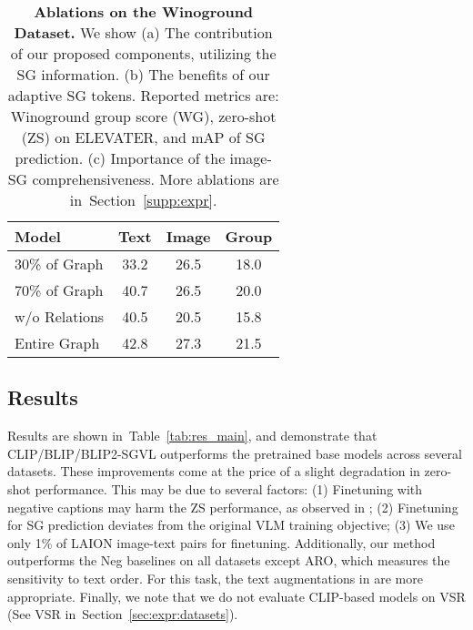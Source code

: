 \documentclass[11pt]{article}
\def\Secref#1{Section~\ref{#1}}
\newcommand{\tabref}[1]{Table~\ref{#1}}
\newcommand{\smodel}{SGVL}
\def\Secref#1{Section~\ref{#1}}
\begin{document}
\begin{table*}[ht]
\begin{subtable}[t]{0.25\linewidth}
\begin{tabularx}
{1\linewidth}{@{}l c c c}
        \toprule
        Model & Text & Image & Group \\
        \midrule
        30\% of Graph & 33.2 & 26.5  & 18.0  \\
        70\% of Graph & 40.7 & 26.5  & 20.0  \\
        w/o Relations & 40.5 & 20.5  & 15.8  \\
Entire Graph & 42.8 & 27.3  & 21.5  \\
        \bottomrule
\end{tabularx}
         \label{tab:comprehensivness}
     \end{subtable}
     \vspace{-0.5em}
     \caption{\textbf{Ablations on the Winoground Dataset.} We show (a) The contribution of our proposed components, utilizing the SG information. (b) The benefits of our adaptive SG tokens. Reported metrics are: Winoground group score (WG), zero-shot (ZS) on ELEVATER, and mAP of SG prediction. (c) Importance of the image-SG comprehensiveness. More ablations are in~\Secref{supp:expr}.}
     \label{tab:ablations}
    \vspace{-1.0em}
\end{table*} \subsection{Results}
\label{sec:expr:results}




Results are shown in~\tabref{tab:res_main}, and demonstrate that CLIP/BLIP/BLIP2-{\smodel} outperforms the pretrained base models across several datasets. These improvements come at the price of a slight degradation in zero-shot performance. This may be due to several factors: (1) Finetuning with negative captions may harm the ZS performance, as observed in \citet{yuksekgonul2023when}; (2) Finetuning for SG prediction deviates from the original VLM training objective; (3) We use only 1\% of LAION image-text pairs for finetuning. Additionally, our method outperforms the Neg baselines on all datasets except ARO, which measures the sensitivity to text order. For this task, the text augmentations in \citet{yuksekgonul2023when} are more appropriate. Finally, we note that we do not evaluate CLIP-based models on VSR (See VSR in~\Secref{sec:expr:datasets}).
\end{document}
